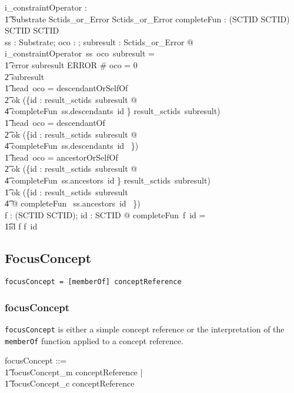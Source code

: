 \documentclass{article}
\def\spec#1{{\tt #1}}
\begin{document}
\begin{gendef}
   i\_constraintOperator : \\
\t1 Substrate \pfun \optional[constraintOperator] \pfun Sctids\_or\_Error \pfun Sctids\_or\_Error
\also
   completeFun : (SCTID \pfun \power SCTID) \fun SCTID \fun \power SCTID \\
\where
	\forall ss : Substrate; oco : \optional[constraintOperator]; subresult : Sctids\_or\_Error @ \\
i\_constraintOperator~ss~oco~subresult = \\
\t1 \IF error \inv subresult \in ERROR \lor \# oco = 0 \\
\t2 \THEN subresult \\
\t1 \ELSE \IF head~oco = descendantOrSelfOf~ \\
\t2 \THEN ok (\bigcup \{id : result\_sctids~subresult @ \\
\t4 completeFun~ss.descendants~id \} \cup result\_sctids~subresult) \\
\t1 \ELSE \IF head~oco = descendantOf~ \\
\t2 \THEN ok  (\bigcup \{id : result\_sctids~subresult @ \\
\t4 completeFun~ss.descendants~id ~\}) \\
\t1 \ELSE \IF head~oco = ancestorOrSelfOf~ \\
\t2 \THEN  ok (\bigcup \{id : result\_sctids~subresult @ \\
\t4 completeFun~ss.ancestors~id \} \cup result\_sctids~subresult) \\
\t1 \ELSE  ok (\bigcup \{id : result\_sctids~subresult \\
\t4 @ completeFun~ ss.ancestors~id ~\}) \\
\also
   \forall f : (SCTID \pfun \power SCTID); id : SCTID @ completeFun~f~id = \\
\t1\IF id \in \dom f \THEN f~id \ELSE \emptyset 
\end{gendef}


\subsection{FocusConcept}
\begin{verbatim}
focusConcept = [memberOf] conceptReference
\end{verbatim}
\subsubsection{focusConcept}
\spec{focusConcept} is either a simple concept reference or the interpretation of the \spec{memberOf} function applied to a concept reference.
\begin{zed}
focusConcept ::= \\
\t1 focusConcept\_m \ldata conceptReference \rdata | \\
\t1 focusConcept\_c \ldata conceptReference \rdata
\end{zed}
\end{document}
